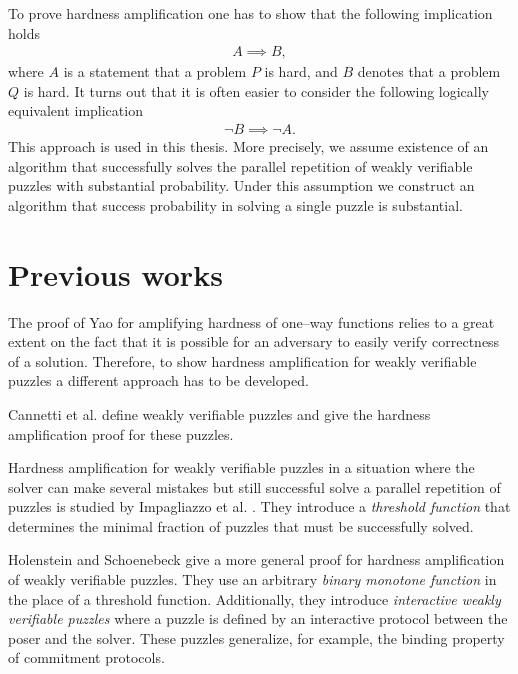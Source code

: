 To prove hardness amplification one has to show that the following implication holds
\begin{align*}
  A \implies B,
\end{align*}
where $A$ is a statement that a problem $P$ is hard, and $B$ denotes that a problem $Q$ is hard.
It turns out that it is often easier to consider the following logically equivalent implication
\begin{align*}
  \lnot B \implies \lnot A.
\end{align*}
This approach is used in this thesis. More precisely, we assume existence of an algorithm that successfully
solves the parallel repetition of weakly verifiable puzzles with substantial probability.
Under this assumption we construct an algorithm that success probability in solving a single puzzle is substantial.

\section{Previous works}
The proof of Yao for amplifying hardness of one--way functions relies to a great extent on the fact that it is possible
for an adversary to easily verify correctness of a solution. Therefore, to show hardness amplification
for weakly verifiable puzzles a different approach has to be developed.

Cannetti et al. \cite{canetti2005hardness} define weakly verifiable puzzles and give the hardness amplification proof for these puzzles.

Hardness amplification for weakly verifiable puzzles in a situation where the solver can make several mistakes but still
successful solve a parallel repetition of puzzles is studied by Impagliazzo et al. \cite{impagliazzo2007chernoff}.
They introduce a \textit{threshold function} that determines the minimal fraction of puzzles that must be successfully solved.

Holenstein and Schoenebeck \cite{holenstein2011general} give a more general proof for hardness amplification
of weakly verifiable puzzles. They use an arbitrary \textit{binary monotone function} in the place of a threshold function.
Additionally, they introduce \textit{interactive weakly verifiable puzzles} where a puzzle is defined by
an interactive protocol between the poser and the solver. These puzzles generalize, for example, the binding property of commitment protocols.


